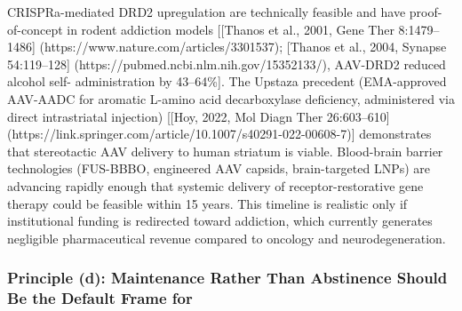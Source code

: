 CRISPRa-mediated DRD2 upregulation are technically feasible and have proof-of-concept in rodent addiction models {[}{[}Thanos et al., 2001, Gene Ther 8:1479--1486{]} (https://www.nature.com/articles/3301537); {[}Thanos et al., 2004, Synapse 54:119--128{]} (https://pubmed.ncbi.nlm.nih.gov/15352133/), AAV-DRD2 reduced alcohol self- administration by 43--64\%{]}. The Upstaza precedent (EMA-approved AAV-AADC for aromatic L-amino acid decarboxylase deficiency, administered via direct intrastriatal injection) {[}{[}Hoy, 2022, Mol Diagn Ther 26:603--610{]} (https://link.springer.com/article/10.1007/s40291-022-00608-7){]} demonstrates that stereotactic AAV delivery to human striatum is viable. Blood-brain barrier technologies (FUS-BBBO, engineered AAV capsids, brain-targeted LNPs) are advancing rapidly enough that systemic delivery of receptor-restorative gene therapy could be feasible within 15 years. This timeline is realistic only if institutional funding is redirected toward addiction, which currently generates negligible pharmaceutical revenue compared to oncology and neurodegeneration.

\subsubsection{Principle (d): Maintenance Rather Than Abstinence Should Be the Default Frame for}\label{18_restoration-principle-d-maintenance-rather-than-abstinence-should-be-the-default-frame-for}

